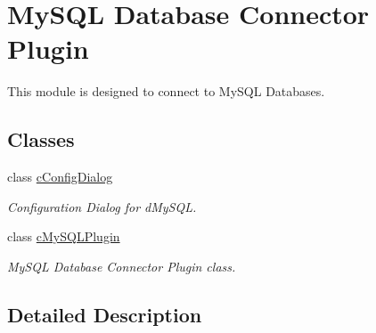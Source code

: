 \hypertarget{group___m_y_s_q_l}{}\section{My\+S\+QL Database Connector Plugin}
\label{group___m_y_s_q_l}


This module is designed to connect to My\+S\+QL Databases.  


\subsection*{Classes}
\begin{DoxyCompactItemize}
\item 
class \hyperlink{classc_config_dialog}{c\+Config\+Dialog}
\begin{DoxyCompactList}\small\item\em Configuration Dialog for d\+My\+S\+QL. \end{DoxyCompactList}\item 
class \hyperlink{classc_my_s_q_l_plugin}{c\+My\+S\+Q\+L\+Plugin}
\begin{DoxyCompactList}\small\item\em My\+S\+QL Database Connector Plugin class. \end{DoxyCompactList}\end{DoxyCompactItemize}


\subsection{Detailed Description}
